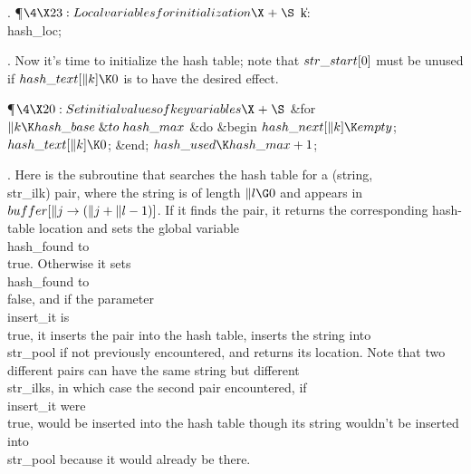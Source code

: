 .
\Y\P$\4\X23:Local variables for initialization\X\mathrel{+}\S$\6
\4\|k: \\{hash\_loc};\par
\fi

.
Now it's time to initialize the hash table; note that $\\{str\_start}[0]$
must be unused if $\\{hash\_text}[\|k]\K0$ is to have the desired effect.

\Y\P$\4\X20:Set initial values of key variables\X\mathrel{+}\S$\6
\&{for} $\|k\K\\{hash\_base}\mathrel{\&{to}}\\{hash\_max}$ \1\&{do}\6
\&{begin} $\\{hash\_next}[\|k]\K\\{empty}$;\5
$\\{hash\_text}[\|k]\K0$;\6
\&{end};\2\6
$\\{hash\_used}\K\\{hash\_max}+1$;\par
\fi

.
Here is the subroutine that searches the hash table for a
(string,~\\{str\_ilk}) pair, where the string is of length $\|l\G0$ and
appears in $\\{buffer}[\|j\to(\|j+\|l-1)]$.  If it finds the pair, it returns
the
corresponding hash-table location and sets the global variable
\\{hash\_found} to \\{true}.  Otherwise it sets \\{hash\_found} to \\{false},
and if the parameter \\{insert\_it} is \\{true}, it inserts the pair into
the hash table, inserts the string into \\{str\_pool} if not previously
encountered, and returns its location.  Note that two different pairs
can have the same string but different \\{str\_ilk}s, in which case the
second pair encountered, if \\{insert\_it} were \\{true}, would be inserted
into the hash table though its string wouldn't be inserted into
\\{str\_pool} because it would already be there.


